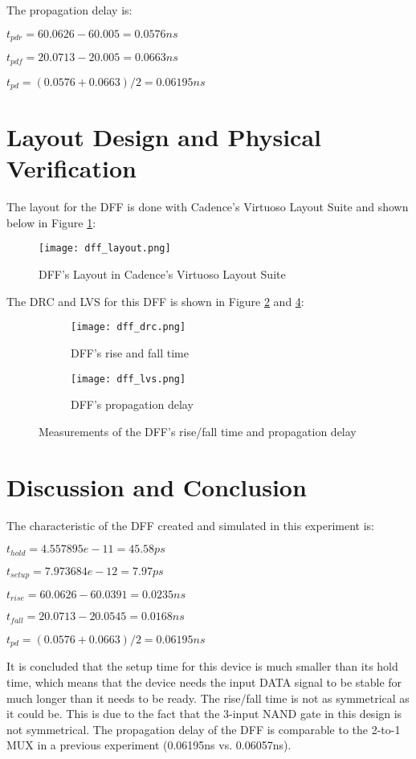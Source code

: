 \documentclass[letterpaper, 11pt]{article}
\begin{document}
The propagation delay is: 

$t_{pdr} = 60.0626-60.005 = 0.0576ns$

$t_{pdf} = 20.0713-20.005 = 0.0663ns$

$t_{pd} = (0.0576 + 0.0663)/2 = 0.06195ns$

\newpage
\section{Layout Design and Physical Verification}
\label{sec:layout_phys_verify}

The layout for the DFF is done with Cadence's Virtuoso Layout Suite and shown below in Figure \ref{fig8}:

\begin{figure}[htb!]
	\centering
	\texttt{[image: dff\_layout.png]}
	\caption{DFF's Layout in Cadence's Virtuoso Layout Suite}
	\label{fig8}
\end{figure}

The DRC and LVS for this DFF is shown in Figure \ref{fig9a} and \ref{fig9b}:

\begin{figure}[ht!]
	\centering
	\begin{subfigure}[b]{.48\linewidth}
		\texttt{[image: dff\_drc.png]}
		\caption{DFF's rise and fall time}
		\label{fig9a}
	\end{subfigure}
	\begin{subfigure}[b]{.48\linewidth}
		\texttt{[image: dff\_lvs.png]}
		\caption{DFF's propagation delay}
		\label{fig9b}
	\end{subfigure}
	\caption{Measurements of the DFF's rise/fall time and propagation delay}
\end{figure}

\newpage
\section{Discussion and Conclusion}
\label{sec:disc_n_concl}

The characteristic of the DFF created and simulated in this experiment is:

$t_{hold} = 4.557895e-11 = 45.58ps$

$t_{setup} = 7.973684e-12 = 7.97ps$

$t_{rise} = 60.0626-60.0391 = 0.0235ns$

$t_{fall} = 20.0713-20.0545 = 0.0168ns$

$t_{pd} = (0.0576 + 0.0663)/2 = 0.06195ns$

It is concluded that the setup time for this device is much smaller than its hold time, which means that the device needs the input DATA signal to be stable for much longer than it needs to be ready. 
The rise/fall time is not as symmetrical as it could be. This is due to the fact that the 3-input NAND gate in this design is not symmetrical. The propagation delay of the DFF is comparable to the 2-to-1 MUX in a previous experiment (0.06195ns vs. 0.06057ns).
\end{document}
